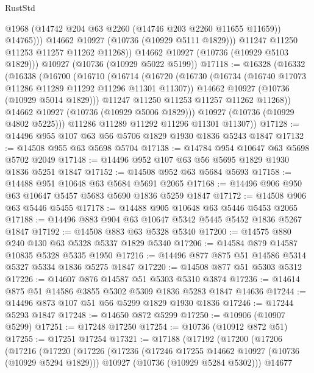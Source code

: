 \begin{lexlean}{RustStd}
\begin{coremodule}
                  @1968
                  (@14742 @204 @63 @2260 (@14746 @203 @2260 @11655 @11659))
                  @14765)))
            @14662
            @10927
            (@10736 (@10929 @5111 @1829)))
          @11247
          @11250
          @11253
          @11257
          @11262
          @11268))
      @14662
      @10927
      (@10736 (@10929 @5103 @1829)))
    @10927
    (@10736 (@10929 @5022 @5199))
@17118 := @16328
    (@16332
      (@16338
        (@16700
          (@16710
            (@16714
              (@16720
                (@16730
                  (@16734 (@16740 @17073 @11286 @11289 @11292 @11296 @11301 @11307))
                  @14662
                  @10927
                  (@10736 (@10929 @5014 @1829)))
                @11247
                @11250
                @11253
                @11257
                @11262
                @11268))
            @14662
            @10927
            (@10736 (@10929 @5006 @1829)))
          @10927
          (@10736 (@10929 @4802 @5225)))
        @11286
        @11289
        @11292
        @11296
        @11301
        @11307))
@17128 := @14496 @955 @107 @63 @56 @5706 @1829 @1930 @1836 @5243 @1847
@17132 := @14508 @955 @63 @5698 @5704
@17138 := @14784 @954 @10647 @63 @5698 @5702 @2049
@17148 := @14496 @952 @107 @63 @56 @5695 @1829 @1930 @1836 @5251 @1847
@17152 := @14508 @952 @63 @5684 @5693
@17158 := @14488 @951 @10648 @63 @5684 @5691 @2065
@17168 := @14496 @906 @950 @63 @10647 @5457 @5683 @5690 @1836 @5259 @1847
@17172 := @14508 @906 @63 @5446 @5455
@17178 := @14488 @905 @10648 @63 @5446 @5453 @2065
@17188 := @14496 @883 @904 @63 @10647 @5342 @5445 @5452 @1836 @5267 @1847
@17192 := @14508 @883 @63 @5328 @5340
@17200 := @14575 @880 @240 @130 @63 @5328 @5337 @1829 @5340
@17206 := @14584 @879 @14587 @10835 @5328 @5335 @1950
@17216 := @14496 @877 @875 @51 @14586 @5314 @5327 @5334 @1836 @5275 @1847
@17220 := @14508 @877 @51 @5303 @5312
@17226 := @14607 @876 @14587 @51 @5303 @5310 @3874
@17236 := @14614 @875 @51 @14586 @3855 @5302 @5309 @1836 @5283 @1847 @14636
@17244 := @14496 @873 @107 @51 @56 @5299 @1829 @1930 @1836
@17246 := @17244 @5293 @1847
@17248 := @14650 @872 @5299
@17250 := @10906 (@10907 @5299)
@17251 := @17248 @17250
@17254 := @10736 (@10912 @872 @51)
@17255 := @17251 @17254
@17321 := @17188
    (@17192
      (@17200
        (@17206
          (@17216
            (@17220
              (@17226
                (@17236
                  (@17246 @17255 @14662 @10927 (@10736 (@10929 @5294 @1829)))
                  @10927
                  (@10736 (@10929 @5284 @5302)))
                @14677

\end{coremodule}
\end{lexlean}
